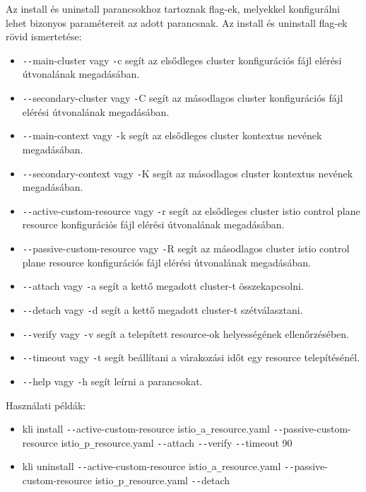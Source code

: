 Az install és uninstall parancsokhoz tartoznak flag-ek, melyekkel konfigurálni lehet bizonyos paramétereit az adott parancsnak.
Az install és uninstall flag-ek rövid ismertetése:
\begin{itemize}
    \item \texttt{-{}-}main-cluster vagy \texttt{-}c segít az elsődleges cluster konfigurációs fájl elérési útvonalának megadásában.
    \item \texttt{-{}-}secondary-cluster vagy \texttt{-}C segít az másodlagos cluster konfigurációs fájl elérési útvonalának megadásában.
    \item \texttt{-{}-}main-context vagy \texttt{-}k segít az elsődleges cluster kontextus nevének megadásában.
    \item \texttt{-{}-}secondary-context vagy \texttt{-}K segít az másodlagos cluster kontextus nevének megadásában.
    \item \texttt{-{}-}active-custom-resource vagy \texttt{-}r segít az elsődleges cluster istio control plane resource konfigurációs fájl elérési útvonalának megadásában.
    \item \texttt{-{}-}passive-custom-resource vagy \texttt{-}R segít az másodlagos cluster istio control plane resource konfigurációs fájl elérési útvonalának megadásában.
    \item \texttt{-{}-}attach vagy \texttt{-}a segít a kettő megadott cluster-t összekapcsolni.
    \item \texttt{-{}-}detach vagy \texttt{-}d segít a kettő megadott cluster-t szétválasztani.
    \item \texttt{-{}-}verify vagy \texttt{-}v segít a telepített resource-ok helyességének ellenőrzésében.
    \item \texttt{-{}-}timeout vagy \texttt{-}t segít beállítani a várakozási időt egy resource telepítésénél.
    \item \texttt{-{}-}help vagy \texttt{-}h segít leírni a parancsokat.
\end{itemize}

Használati példák:
\begin{itemize}
    \item kli install \texttt{-{}-}active-custom-resource istio\texttt{\_}a\texttt{\_}resource.yaml \texttt{-{}-}passive-custom-resource istio\texttt{\_}p\texttt{\_}resource.yaml \texttt{-{}-}attach \texttt{-{}-}verify \texttt{-{}-}timeout 90
    \item kli uninstall \texttt{-{}-}active-custom-resource istio\texttt{\_}a\texttt{\_}resource.yaml \texttt{-{}-}passive-custom-resource istio\texttt{\_}p\texttt{\_}resource.yaml \texttt{-{}-}detach
\end{itemize}

